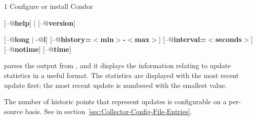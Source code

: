 \begin{ManPage}{\label{man-condor-updates-stats}}{1}
{Configure or install Condor}

\Synopsis {}
[\verb@--@\textbf{help}] $|$ [\verb@--@\textbf{version}]

[\verb@--@\textbf{long} $|$ \verb@-@\textbf{l}]
[\verb@--@\textbf{history=$<$min$>$-$<$max$>$}]
[\verb@--@\textbf{interval=$<$seconds$>$}]
[\verb@--@\textbf{notime}]
[\verb@--@\textbf{time}]






\Description 

 parses the output from ,
and it displays the information relating to update statistics
in a useful format.
The statistics are displayed with the most recent update first;
the most recent update is numbered with the smallest value.

The number of historic points that represent updates is
configurable on a per-source basis.
See  in
section~\ref{sec:Collector-Config-File-Entries}.


\end{ManPage}
